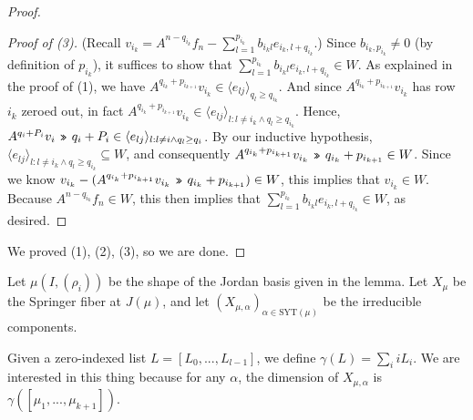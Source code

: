 \documentclass[12pt,psamsfonts]{article}
\newcommand{\leftshift}{\,\texttt{<<}\,}
\newcommand{\rightshift}{\mathbin{\rotatebox[origin=c]{180}{\leftshift}}}
\begin{document}
\begin{proof}
\begin{proof}[Proof of (3)]
        (Recall \(v_{i_k} = A^{n - q_{i_k}} f_n - \sum_{l = 1}^{p_{i_k}} b_{i_kl} e_{i_k,l + q_{i_k}}\).)
        Since \(b_{i_k,p_{i_k}} \neq 0\) (by definition of \(p_{i_k}\)), it suffices to show that \(\sum_{l = 1}^{p_{i_k}} b_{i_kl} e_{i_k,l + q_{i_k}} \in W\).
        As explained in the proof of (1), we have \(A^{q_{i_k} + p_{i_{k + 1}}} v_{i_k} \in \langle e_{lj} \rangle_{q_l \geq q_{i_k}}\).
        And since \(A^{q_{i_k} + p_{i_{k + 1}}} v_{i_k}\) has row \(i_k\) zeroed out, in fact \(A^{q_{i_k} + p_{i_{k + 1}}} v_{i_k} \in \langle e_{lj} \rangle_{l : l \neq i_k \land q_l \geq q_{i_k}}\).
        Hence, \(A^{q_i + P_i} v_i \rightshift q_i + P_i \in \langle e_{lj} \rangle_{l : l \neq i \land q_l \geq q_i}\).
        By our inductive hypothesis, \(\langle e_{lj} \rangle_{l : l \neq i_k \land q_l \geq q_{i_k}} \subseteq W\), and consequently \(A^{q_{i_k} + p_{i_{k + 1}}} v_{i_k} \rightshift q_{i_k} + p_{i_{k + 1}} \in W\).
        Since we know \(v_{i_k} - (A^{q_{i_k} + p_{i_{k + 1}}} v_{i_k} \rightshift q_{i_k} + p_{i_{k + 1}}) \in W\), this implies that \(v_{i_k} \in W\).
        Because \(A^{n - q_{i_k}} f_n \in W\), this then implies that \(\sum_{l = 1}^{p_{i_k}} b_{i_kl} e_{i_k,l + q_{i_k}} \in W\), as desired.
    \end{proof}
    We proved (1), (2), (3), so we are done.
\end{proof}

Let \(\mu(I, (\rho_i))\) be the shape of the Jordan basis given in the lemma.
Let \(X_\mu\) be the Springer fiber at \(J(\mu)\), and let \((X_{\mu, \alpha})_{\alpha \in \mathrm{SYT}(\mu)}\) be the irreducible components.
\par Given a zero-indexed list \(L = [L_0, ..., L_{l - 1}]\), we define \(\gamma(L) = \sum_i i L_i\).
We are interested in this thing because for any \(\alpha\), the dimension of \(X_{\mu, \alpha}\) is \(\gamma([\mu_1, ..., \mu_{k + 1}])\).
\end{document}
